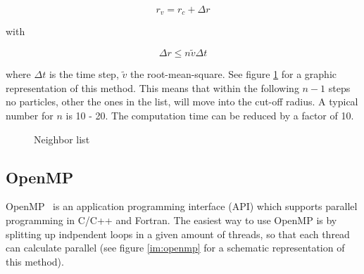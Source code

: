 \documentclass[a4paper]{article}
\begin{document}
\begin{equation}
r_v = r_c + \Delta r
\label{eq:neigbor1}
\end{equation}

with

\begin{equation}
\Delta r \leq n \tilde{v} \Delta t
\label{eq:neighbor2}
\end{equation}

where $\Delta t$ is the time step, $\tilde{v}$ the root-mean-square. See figure \ref{im:neighbor_list} for a graphic representation of this method. This means that within the following $n-1$ steps no particles, other the ones in the list, will move into the cut-off radius. A typical number for $n$ is 10 - 20. The computation time can be reduced by a factor of 10.

\begin{figure}[H]
\centering
{}
\label{im:neighbor_list}
\caption{Neighbor list}
\end{figure}

\subsection{OpenMP}

OpenMP~\cite{OpenMP} is an application programming interface (API) which supports parallel programming in C/C++ and Fortran. The easiest way to use OpenMP is by splitting up indpendent loops in a given amount of threads, so that each thread can calculate parallel (see figure \ref{im:openmp} for a schematic representation of this method). 
\end{document}
